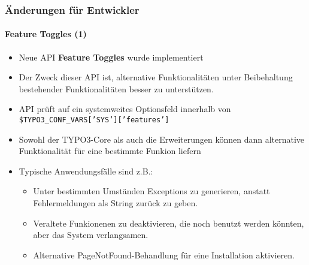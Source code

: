 
\begin{frame}[fragile]
	\frametitle{Änderungen für Entwickler}
	\framesubtitle{Feature Toggles (1)}

	\begin{itemize}
		\item Neue API \textbf{Feature Toggles} wurde implementiert
		\item Der Zweck dieser API ist, alternative Funktionalitäten
			unter Beibehaltung bestehender Funktionalitäten besser zu unterstützen. 
		\item API prüft auf ein systemweites Optionsfeld innerhalb von\newline
			\small
				\texttt{\$TYPO3\_CONF\_VARS['SYS']['features']}
			\normalsize
		\item Sowohl der TYPO3-Core als auch die Erweiterungen können dann
			alternative Funktionalität für eine bestimmte Funkion liefern
		\item Typische Anwendungsfälle sind z.B.:
			\smaller
			\begin{itemize}
				\item Unter bestimmten Umständen Exceptions zu generieren, anstatt
					Fehlermeldungen als String zurück zu geben.
				\item Veraltete Funkionenen zu deaktivieren, die noch benutzt werden könnten,
					aber das System verlangsamen.
				\item Alternative PageNotFound-Behandlung für eine Installation aktivieren.
			\end{itemize}
			\normalsize

	\end{itemize}

\end{frame}


